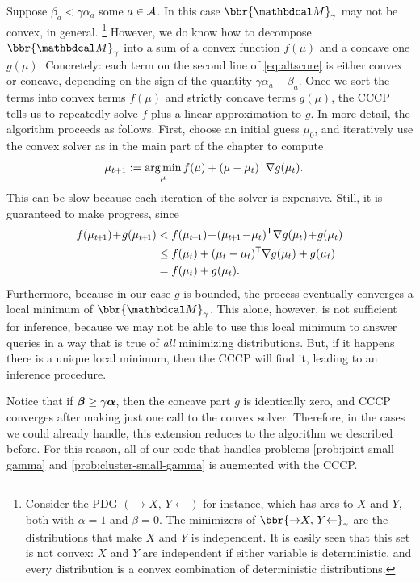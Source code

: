 \begin{subappendices}
Suppose
    $\beta_a < \gamma \alpha_a$ some $a \in \mathcal A$.
In this case $\bbr{\dg M}_\gamma$ may not be convex, in general.%
\footnote{
    Consider the PDG $({\to} X,\, Y {\gets})$ for instance, which
    has arcs to $X$ and $Y$, both with $\alpha = 1$ and $\beta = 0$.
    The minimizers of
     $\bbr{{\to} X,\, Y {\gets}}_\gamma$
        are the distributions that make $X$ and $Y$ is independent.
    It is easily seen that this set
    is not convex: $X$ and $Y$ are independent if either variable is deterministic,
    and every distribution is a convex combination of deterministic distributions.
    }
However, we do know how to decompose $\bbr{\dg M}_\gamma$ into a sum
of a convex function $f(\mu)$ and a concave one $g(\mu)$.
Concretely: each term on the second line of \eqref{eq:altscore} is either convex or concave, depending on the sign of the quantity $\gamma \alpha_a - \beta_a$.
Once we sort the terms into convex terms $f(\mu)$ and strictly concave terms $g(\mu)$,
    the CCCP tells us to repeatedly solve $f$ plus a
        linear approximation to $g$.
In more detail, the algorithm proceeds as follows.
First, choose an initial guess $\mu_0$, and iteratively use the convex solver
    as in the main part of the chapter to compute
\begin{align*}
    \mu_{t+1} &:= \operatorname*{arg\,min}_{\mu} f(\mu) + (\mu - \mu_{t})^{\sf T}
        \nabla g(\mu_t).
\end{align*}
This can be slow because each iteration of the solver is expensive.
Still, it is guaranteed to make progress, since
\def\tplus1{{t\mskip-2mu+\mskip-2mu1}}
\begin{align*}
    f(\mu_\tplus1) \!+\! g(\mu_\tplus1) &<  f(\mu_\tplus1) \!+\! (\mu_\tplus1 \!-\! \mu_t)^{\sf T} \nabla g(\mu_t) \!+\! g(\mu_t)
        \\
    &\le  f(\mu_t) + (\mu_t - \mu_{t})^{\sf T}\nabla g(\mu_t)  + g(\mu_t)
    \\
&= f(\mu_t) + g(\mu_t).
\end{align*}
Furthermore, because in our case $g$ is bounded,
    the process eventually converges a local minimum
    of $\bbr{\dg M}_\gamma$.
This alone, however, is not sufficient for inference,
because we may not be able to use this local minimum
    to answer queries in a way that is true of \emph{all} minimizing distributions.
But, if it happens there is a unique local minimum, then the CCCP will
    find it, leading to an inference procedure.




Notice that if $\boldsymbol\beta \ge \gamma\boldsymbol\alpha$, then the concave part $g$ is identically
zero, and CCCP converges after making just one call to the convex solver.
Therefore, in the cases we could already handle, this extension
reduces to the algorithm we described before.
For this reason, all of our code that handles problems
 \eqref{prob:joint-small-gamma} and \eqref{prob:cluster-small-gamma}
is augmented with the CCCP.






\end{subappendices}
